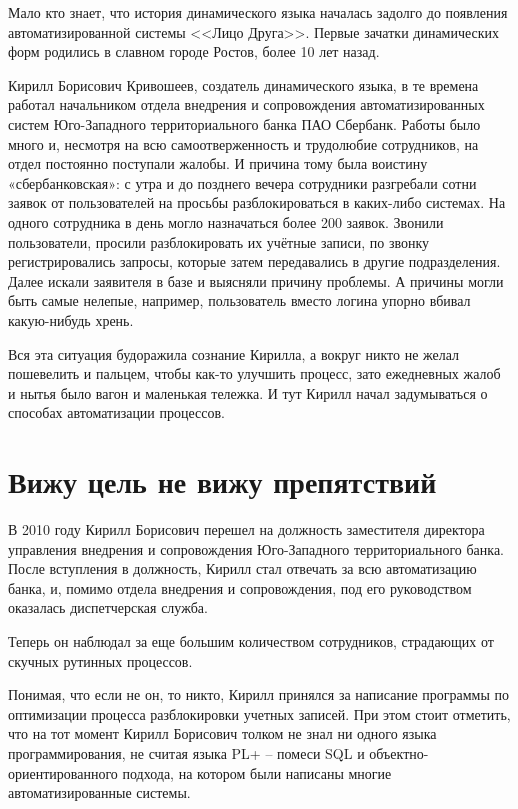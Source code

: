 \documentclass[../index.tex]{subfiles}
\begin{document}
Мало кто знает, что история динамического языка началась задолго до появления автоматизированной системы <<Лицо Друга>>. Первые зачатки динамических форм родились в славном городе Ростов, более 10 лет назад.


Кирилл Борисович Кривошеев, создатель динамического языка,  в те времена работал начальником отдела внедрения и сопровождения автоматизированных систем Юго-Западного территориального банка ПАО Сбербанк. Работы было много и, несмотря на всю самоотверженность и трудолюбие сотрудников, на отдел постоянно поступали жалобы. И причина тому была воистину «сбербанковская»: с утра и до позднего вечера сотрудники разгребали сотни заявок от пользователей на просьбы разблокироваться в каких-либо системах. На одного сотрудника в день могло назначаться более 200 заявок. Звонили пользователи, просили разблокировать их учётные записи, по звонку регистрировались запросы, которые затем передавались в другие подразделения. Далее искали заявителя в базе и выясняли причину проблемы. А причины могли быть самые нелепые, например, пользователь вместо логина упорно вбивал какую-нибудь хрень.


Вся эта ситуация будоражила сознание Кирилла, а вокруг никто не желал пошевелить и пальцем, чтобы как-то улучшить процесс, зато ежедневных жалоб и нытья было вагон и маленькая тележка. 
И тут Кирилл начал задумываться о способах автоматизации процессов.

\section{Вижу цель не вижу препятствий}

В 2010 году Кирилл Борисович перешел на должность заместителя директора управления внедрения и сопровождения Юго-Западного территориального банка. После вступления в должность, Кирилл стал отвечать за всю автоматизацию банка, и, помимо отдела внедрения и сопровождения, под его руководством оказалась диспетчерская служба.

Теперь он наблюдал за еще большим количеством сотрудников, страдающих от скучных рутинных процессов. 


Понимая, что если не он, то никто, Кирилл принялся за написание программы по оптимизации процесса разблокировки учетных записей. При этом стоит отметить, что на тот момент Кирилл Борисович толком не знал ни одного языка программирования, не считая языка PL+ -- помеси SQL и объектно-ориентированного подхода, на котором были написаны многие автоматизированные системы. 
\end{document}
